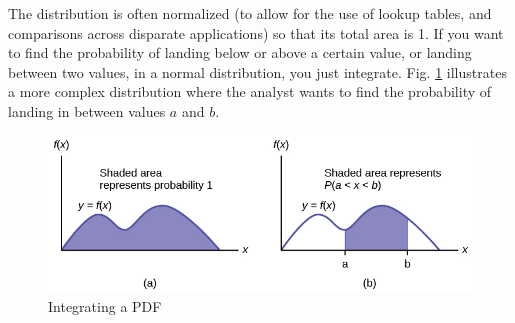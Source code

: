 \documentclass[10pt]{article}
\begin{document}



The distribution is often normalized (to allow for the use of lookup tables, and comparisons across disparate applications) so that its total area is 1. If you want to find the probability of landing below or above a certain value, or landing between two values, in a normal distribution, you just integrate. Fig. \ref{int} illustrates a more complex distribution where the analyst wants to find the probability of landing in between values $a$ and $b$.

            \begin{figure}[h]
            \centering
            \includegraphics[width=11.5cm]{extras26/PDFintegration}
            \caption{Integrating a PDF \cite{Illowsky2014-stats}}
            \label{int}
            \end{figure}
\end{document}
